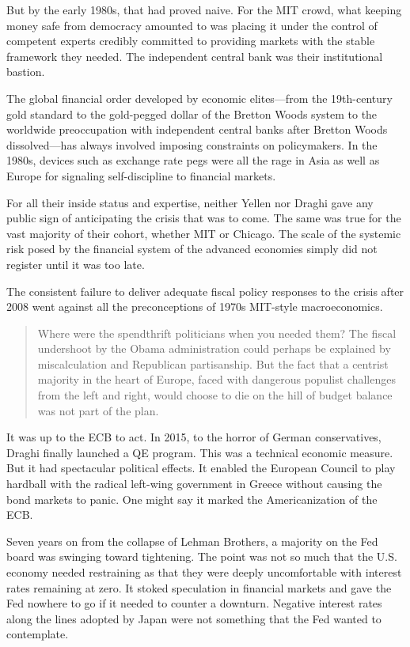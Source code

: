\documentclass[
]{book}
\begin{document}
But by the early 1980s, that had proved naive. For the MIT crowd, what keeping money safe from democracy amounted to was placing it under the control of competent experts credibly committed to providing markets with the stable framework they needed. The independent central bank was their institutional bastion.

The global financial order developed by economic elites---from the 19th-century gold standard to the gold-pegged dollar of the Bretton Woods system to the worldwide preoccupation with independent central banks after Bretton Woods dissolved---has always involved imposing constraints on policymakers. In the 1980s, devices such as exchange rate pegs were all the rage in Asia as well as Europe for signaling self-discipline to financial markets.

For all their inside status and expertise, neither Yellen nor Draghi gave any public sign of anticipating the crisis that was to come. The same was true for the vast majority of their cohort, whether MIT or Chicago. The scale of the systemic risk posed by the financial system of the advanced economies simply did not register until it was too late.

The consistent failure to deliver adequate fiscal policy responses to the crisis after 2008 went against all the preconceptions of 1970s MIT-style macroeconomics.

\begin{quote}
Where were the spendthrift politicians when you needed them? The fiscal undershoot by the Obama administration could perhaps be explained by miscalculation and Republican partisanship. But the fact that a centrist majority in the heart of Europe, faced with dangerous populist challenges from the left and right, would choose to die on the hill of budget balance was not part of the plan.
\end{quote}

It was up to the ECB to act. In 2015, to the horror of German conservatives, Draghi finally launched a QE program. This was a technical economic measure. But it had spectacular political effects. It enabled the European Council to play hardball with the radical left-wing government in Greece without causing the bond markets to panic.
One might say it marked the Americanization of the ECB.

Seven years on from the collapse of Lehman Brothers, a majority on the Fed board was swinging toward tightening. The point was not so much that the U.S. economy needed restraining as that they were deeply uncomfortable with interest rates remaining at zero. It stoked speculation in financial markets and gave the Fed nowhere to go if it needed to counter a downturn. Negative interest rates along the lines adopted by Japan were not something that the Fed wanted to contemplate.
\end{document}
